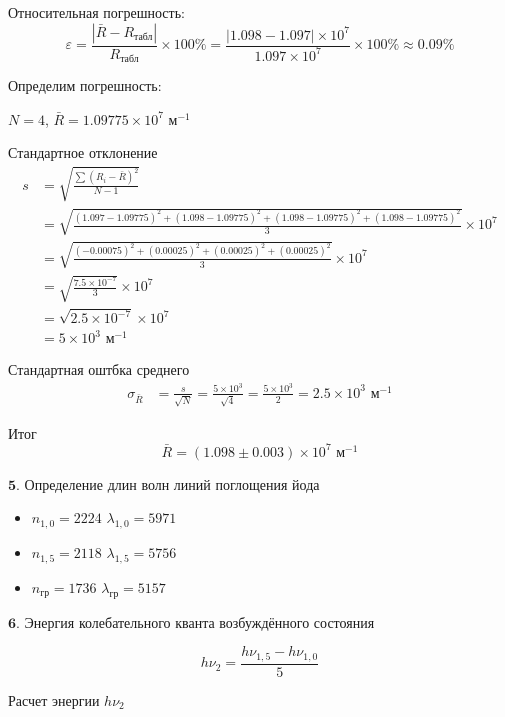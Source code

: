 \documentclass[a4paper]{article}
\begin{document}
Относительная погрешность:
\begin{equation}
\varepsilon = \frac{|\bar{R} - R_{\text{табл}}|}{R_{\text{табл}}} \times 100\% = \frac{|1.098 - 1.097| \times 10^7}{1.097 \times 10^7} \times 100\% \approx 0.09\%
\end{equation}

Определим погрешность:

$N = 4$, $\bar{R} = 1.09775 \times 10^7$ м$^{-1}$

$\textbf{Стандартное отклонение}$
\begin{align}
s &= \sqrt{\frac{\sum(R_i - \bar{R})^2}{N - 1}} \\
&= \sqrt{\frac{(1.097-1.09775)^2 + (1.098-1.09775)^2 + (1.098-1.09775)^2 + (1.098-1.09775)^2}{3}} \times 10^7 \\
&= \sqrt{\frac{(-0.00075)^2 + (0.00025)^2 + (0.00025)^2 + (0.00025)^2}{3}} \times 10^7 \\
&= \sqrt{\frac{7.5 \times 10^{-7}}{3}} \times 10^7 \\
&= \sqrt{2.5 \times 10^{-7}} \times 10^7 \\
&= 5 \times 10^3 \text{ м}^{-1}
\end{align}

$\textbf{Стандартная оштбка среднего}$
\begin{align}
\sigma_{\bar{R}} &= \frac{s}{\sqrt{N}} = \frac{5 \times 10^3}{\sqrt{4}} = \frac{5 \times 10^3}{2} = 2.5 \times 10^3 \text{ м}^{-1}
\end{align}

$\textbf{Итог}$
\begin{equation}
\bar{R} = (1.098 \pm 0.003) \times 10^7 \text{ м}^{-1}
\end{equation}

$\textbf{5.}$ Определение длин волн линий поглощения йода \par

\begin{itemize}
	\item $n_{1,0} = 2224$ $\lambda_{1,0} = 5971$
	\item $n_{1,5} = 2118$ $\lambda_{1,5} = 5756$
	\item $n_{\text{гр}} = 1736$ $\lambda_{\text{гр}} = 5157$
\end{itemize}

$\textbf{6.}$  Энергия колебательного кванта возбуждённого состояния

\[
h\nu_2 = \frac{h\nu_{1,5} - h\nu_{1,0}}{5}
\]

Расчет энергии $h\nu_2$
\end{document}
